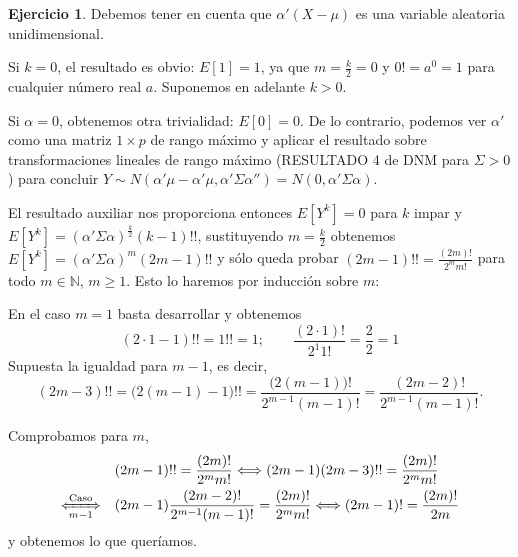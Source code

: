 \documentclass[12pt,spanish]{article}
\theoremstyle{definition}
\newtheorem{exercise}{Ejercicio}
\begin{document}
\setcounter{exercise}{2}
\begin{exercise} %

  Debemos tener en cuenta que $\alpha'(X-\mu)$ es una variable
  aleatoria unidimensional.
  
  Si $k=0$, el resultado es obvio: $E[1]=1$, ya que $m=\frac{k}{2}=0$
  y $0!=a^0=1$ para cualquier número real $a$. Suponemos en adelante
  $k>0$.
  
  Si $\alpha=0$, obtenemos otra trivialidad: $E[0]=0$. De lo
  contrario, podemos ver $\alpha'$ como una matriz $1\times p$ de
  rango máximo y aplicar el resultado sobre transformaciones lineales
  de rango máximo (RESULTADO 4 de DNM para $\Sigma>0$) para concluir
  $Y\sim
  N(\alpha'\mu-\alpha'\mu,\alpha'\Sigma\alpha'')=N(0,\alpha'\Sigma\alpha)$.
  
  El resultado auxiliar nos proporciona entonces $E[Y^k]=0$ para $k$
  impar y \\ $E[Y^k]=(\alpha'\Sigma\alpha)^\frac{k}{2} (k-1)!!$,
  sustituyendo $m=\frac{k}{2}$ obtenemos
  $E[Y^k]=(\alpha'\Sigma\alpha)^m (2m-1)!!$ y sólo queda probar
  $(2m-1)!!=\frac{(2m)!}{2^m m!}$ para todo $m\in\mathbb{N}$,
  $m\geq 1$. Esto lo haremos por inducción sobre $m$:
  
  En el caso $m=1$ basta desarrollar y obtenemos
  \[(2\cdot 1-1)!!=1!!=1;\qquad \frac{(2\cdot 1)!}{2^1
      1!}=\frac{2}{2}=1\] Supuesta la igualdad para $m-1$, es decir,
  \[(2m-3)!!=\big(2(m-1)-1\big)!!=\frac{\big(2(m-1)\big)!}{2^{m-1} (m-1)!}=\frac{(2m-2)!}{2^{m-1} (m-1)!}.\]

  Comprobamos para $m$,
  \begin{align*}
    &(2m-1)!!=\frac{(2m)!}{2^m m!}
      \Longleftrightarrow (2m-1)(2m-3)!!=\frac{(2m)!}{2^m m!} \\
    \xLeftrightarrow[m-1]{\text{Caso}}\quad &(2m-1)\frac{(2m-2)!}{2^{m-1}(m-1)!}=\frac{(2m)!}{2^m m!} \Longleftrightarrow (2m-1)!=\frac{(2m)!}{2m}
  \end{align*}
  y obtenemos lo que queríamos.
  
\end{exercise}
\end{document}
